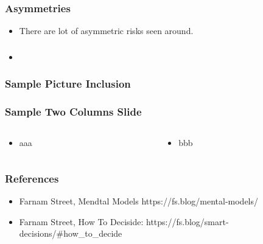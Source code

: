 \begin{frame}[fragile]\frametitle{Asymmetries}

\begin{itemize}
\item There are lot of asymmetric risks seen around.
\end{itemize}
\end{frame}












\begin{frame}[fragile]\frametitle{}
\begin{itemize}
\item 
\end{itemize}
\end{frame}

\begin{frame}[fragile]\frametitle{Sample Picture Inclusion}

\end{frame}


\begin{frame}[fragile]\frametitle{Sample Two Columns Slide}
\begin{columns}
    \begin{column}[T]{0.6\linewidth}
      \begin{itemize}
		\item aaa
	  \end{itemize}

    \end{column}
    \begin{column}[T]{0.4\linewidth}
      \begin{itemize}
		\item bbb
	  \end{itemize}
    \end{column}
  \end{columns}
\end{frame}

\begin{frame}[fragile]\frametitle{References}
\begin{itemize}
\item Farnam Street, Mendtal Models https://fs.blog/mental-models/

\item Farnam Street, How To Deciside: https://fs.blog/smart-decisions/\#how\_to\_decide
\end{itemize}
\end{frame}